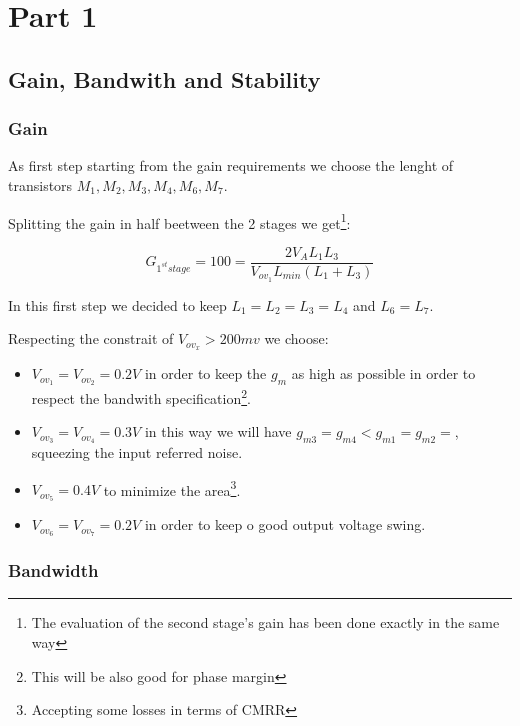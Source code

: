 \chapter{Part 1} %
\label{cha:part_1}

\section{Gain, Bandwith and Stability} %
\label{sec:gain_and_bandwith}

\subsection{Gain} %
\label{subsec:gain}



As first step starting from the gain requirements we choose the lenght of transistors $M_1,M_2,M_3,M_4,M_6,M_7.$

Splitting the gain in half beetween the 2 stages we get\footnote{The evaluation of the second stage's gain has been done exactly in the same way}:

\begin{equation}
	G_{1^{st} stage} = 100 = \frac{2V_AL_1L_3}{V_{ov_1}L_{min}(L_1+L_3)}
\end{equation}


In this first step we decided to keep $L_1=L_2=L_3=L_4$ and $L_6=L_7$.

Respecting the constrait of $V_{ov_x} > 200mv$ we choose:

\begin{itemize}
	\item $V_{ov_1}=V_{ov_2}= 0.2V$ in order to keep the $g_m$ as high as possible in order to respect the bandwith specification\footnote{This will be also good for phase margin}.
	\item $V_{ov_3}=V_{ov_4}= 0.3V$ in this way we will have $g_{m3}=g_{m4}<g_{m1}=g_{m2}=$, squeezing the input referred noise.
	\item $V_{ov_5}= 0.4V$ to minimize the area\footnote{Accepting some losses in terms of CMRR}.
	\item $V_{ov_6}=V_{ov_7}= 0.2V$ in order to keep o good output voltage swing. 
\end{itemize}


\subsection{Bandwidth} %
\label{subsec:bandwidth}



